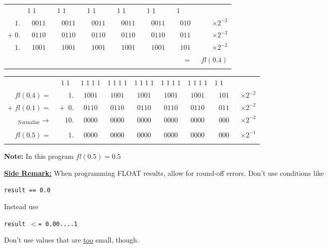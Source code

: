 \documentclass[a4paper,12pt]{report}
\begin{document}
\begin{center}
	\begin{tabular}{rccccccr}
		&  \tiny{$1\;1\qquad\!$} & \tiny{$1\;1\qquad\!$} &  \tiny{$1\;1\qquad\!$} 
			& \tiny{$1\;1\qquad\!$} & \tiny{$1\;1\qquad\!$} & \tiny{$1\qquad \!$} & \\
		$1.$ & $\!0011$ & $0011$ & $0011$ & $0011$ & $0011$ & $010$ & $\times2^{-2}$\\
		$+\;0.$ & $\!0110$ & $0110$ & $0110$ & $0110$ & $0110$ & $011$ & $\times2^{-2}$\\
		\hline
		$1.$ & $\!1001$ & $1001$ & $1001$ & $1001$ & $1001$ & $101$ & $\times2^{-2}$\\
		&&&&&&$\;\;=$& $\! \! \! \!fl(0.4)$\\ \\
	\end{tabular}

	\bigskip

	\begin{tabular}{rrccccccr}
		&\tiny{$1\;1\;\;$} &  \tiny{$1\;1\;1\;1$} & \tiny{$1\;1\;1\;1$} &  \tiny{$1\;1\;1\;1$} 
			& \tiny{$1\;1\;1\;1$}& \tiny{$1\;1\;1\;1$} & \tiny{$1\;1\quad \;\,$} & \\
		$fl(0.4)=$ & $1.$ & $\!1001$ & $1001$ & $1001$ & $1001$ & $1001$ & $101$
			& $\times2^{-2}$\\
		$+\;fl(0.1)=$ & $\!+\;0.$ & $\!0110$ & $0110$ & $0110$ & $0110$ & $0110$ & $011$ 
			& $\times2^{-2}$\\
		\hline
		$_{\text{Normalize}}\rightarrow$& $10.$ & $\!0000$ & $0000$ & $0000$ & $0000$ 
			& $0000$ & $000$ & $\times2^{-2}$\\ \\

		$fl(0.5)=$ & $1.$ & $\!0000$ & $0000$ & $0000$ & $0000$ & $0000$ & $000$ 
			& $\times2^{-1}$\\ \\
	\end{tabular}
\end{center}

	\textbf{Note:} In this program $fl(0.5)= 0.5$

\begin{center}
\fbox
{
	\parbox{0.5\textwidth}
	{
			\textbf{\underline{Side Remark:}} When programming FLOAT results, allow for round-off 
			errors. Don't use conditions like
			\begin{center}
				\texttt{result == 0.0}
			\end{center}
			Instead use
			\begin{center}
				\texttt{result $<$= 0.00....1}
			\end{center}
			Don't use values that are \underline{too} small, though.
	}
}
\end{center}
\end{document}
